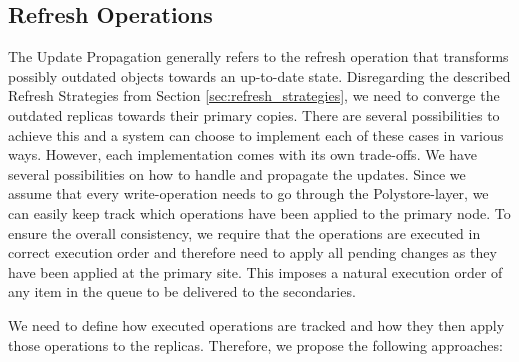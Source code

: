 \subsection{Refresh Operations}
\label{sec:refresh_operations}

The Update Propagation generally refers to the refresh operation that transforms possibly outdated objects towards an up-to-date state.
Disregarding the described Refresh Strategies from Section \ref{sec:refresh_strategies}, we need to converge the outdated replicas towards their 
primary copies.
There are several possibilities to achieve this and a system can choose to implement each of these cases in various ways. However, each implementation comes with its
own trade-offs.
We have several possibilities on how to handle and propagate the updates.
Since we assume that every write-operation needs to go through the Polystore-layer, we can easily keep track which operations have been applied to the primary node.
To ensure the overall consistency, we require that the operations are executed in correct execution order and therefore need to apply all pending changes as they have been applied at the primary site.
This imposes a natural execution order of any item in the queue to be delivered to the secondaries.

We need to define how executed operations are tracked and how they then apply those operations to the replicas. 
Therefore, we propose the following approaches: \\

